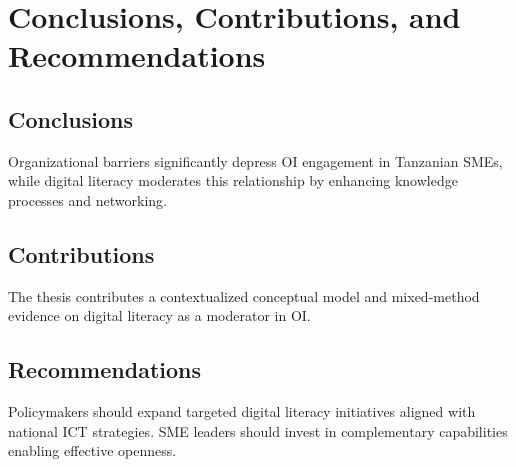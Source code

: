 \chapter{Conclusions, Contributions, and Recommendations}\label{ch:conclusion}

\section{Conclusions}
Organizational barriers significantly depress OI engagement in Tanzanian SMEs, while digital literacy moderates this relationship by enhancing knowledge processes and networking.

\section{Contributions}
The thesis contributes a contextualized conceptual model and mixed-method evidence on digital literacy as a moderator in OI.

\section{Recommendations}
Policymakers should expand targeted digital literacy initiatives aligned with national ICT strategies. SME leaders should invest in complementary capabilities enabling effective openness.
